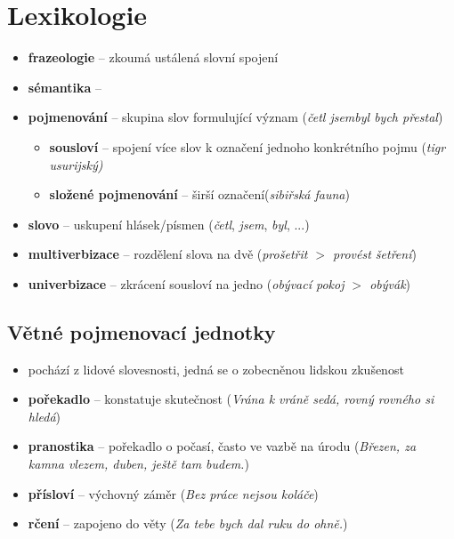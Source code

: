 \section{Lexikologie}
\begin{itemize}
\item \textbf{frazeologie} -- zkoumá ustálená slovní spojení
\item \textbf{sémantika} -- 
\item \textbf{pojmenování} -- skupina slov formulující význam (\textit{četl jsem}\textit{byl bych přestal})
	\begin{itemize}
	\item \textbf{sousloví} -- spojení více slov k označení jednoho konkrétního pojmu (\textit{tigr usurijský)}
	\item \textbf{složené pojmenování} -- širší označení(\textit{sibiřská fauna})
	\end{itemize}
\item \textbf{slovo} -- uskupení hlásek/písmen (\textit{četl}, \textit{jsem}, \textit{byl}, ...)
\item[] \textbf{multiverbizace} -- rozdělení slova na dvě (\textit{prošetřit $>$ provést šetření})
\item[] \textbf{univerbizace} -- zkrácení sousloví na jedno (\textit{obývací pokoj $>$ obývák})
\end{itemize}

\subsection{Větné pojmenovací jednotky}
\begin{itemize}
\item pochází z lidové slovesnosti, jedná se o zobecněnou lidskou zkušenost
\item \textbf{pořekadlo} -- konstatuje skutečnost (\textit{Vrána k vráně sedá, rovný rovného si hledá})
\item \textbf{pranostika} -- pořekadlo o počasí, často ve vazbě na úrodu (\textit{Březen, za kamna vlezem, duben, ještě tam budem.})
\item \textbf{přísloví} -- výchovný záměr (\textit{Bez práce nejsou koláče})
\item \textbf{rčení} -- zapojeno do věty (\textit{Za tebe bych dal ruku do ohně.})
\end{itemize}

